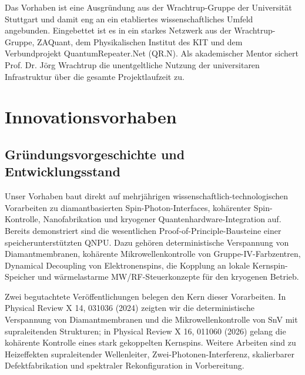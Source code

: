 \documentclass[11pt,oneside]{scrartcl}
\begin{document}
Das Vorhaben ist eine Ausgr\"undung aus der Wrachtrup-Gruppe der Universit\"at Stuttgart und damit eng an ein etabliertes wissenschaftliches Umfeld angebunden. Eingebettet ist es in ein starkes Netzwerk aus der Wrachtrup-Gruppe, ZAQuant, dem Physikalischen Institut des KIT und dem Verbundprojekt QuantumRepeater.Net (QR.N). Als akademischer Mentor sichert Prof. Dr. J\"org Wrachtrup die unentgeltliche Nutzung der universitaren Infrastruktur \"uber die gesamte Projektlaufzeit zu.

\section{Innovationsvorhaben}
\subsection{Gr\"undungsvorgeschichte und Entwicklungsstand}
Unser Vorhaben baut direkt auf mehrj\"ahrigen wissenschaftlich-technologischen Vorarbeiten zu diamantbasierten Spin-Photon-Interfaces, koh\"arenter Spin-Kontrolle, Nanofabrikation und kryogener Quantenhardware-Integration auf. Bereits demonstriert sind die wesentlichen Proof-of-Principle-Bausteine einer speicherunterst\"utzten QNPU. Dazu geh\"oren deterministische Verspannung von Diamantmembranen, koh\"arente Mikrowellenkontrolle von Gruppe-IV-Farbzentren, Dynamical Decoupling von Elektronenspins, die Kopplung an lokale Kernspin-Speicher und w\"armelastarme MW/RF-Steuerkonzepte f\"ur den kryogenen Betrieb.

Zwei begutachtete Ver\"offentlichungen belegen den Kern dieser Vorarbeiten. In Physical Review X 14, 031036 (2024) zeigten wir die deterministische Verspannung von Diamantmembranen und die Mikrowellenkontrolle von SnV mit supraleitenden Strukturen; in Physical Review X 16, 011060 (2026) gelang die koh\"arente Kontrolle eines stark gekoppelten Kernspins. Weitere Arbeiten sind zu Heizeffekten supraleitender Wellenleiter, Zwei-Photonen-Interferenz, skalierbarer Defektfabrikation und spektraler Rekonfiguration in Vorbereitung.
\end{document}
